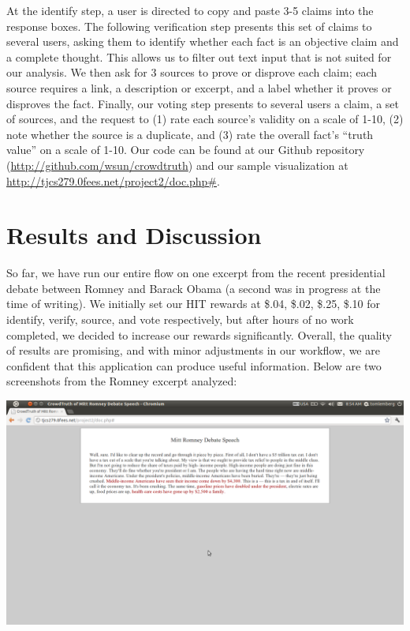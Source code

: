 \documentclass[10pt]{article}
\begin{document}
\noindent
At the identify step, a user is directed to copy and paste 3-5 claims into the response boxes. The following verification step presents this set of claims to several users, asking them to identify whether each fact is an objective claim and a complete thought. This allows us to filter out text input that is not suited for our analysis. We then ask for 3 sources to prove or disprove each claim; each source requires a link, a description or excerpt, and a label whether it proves or disproves the fact. Finally, our voting step presents to several users a claim, a set of sources, and the request to (1) rate each source's validity on a scale of 1-10, (2) note whether the source is a duplicate, and (3) rate the overall fact's ``truth value'' on a scale of 1-10. Our code can be found at our Github repository (\url{http://github.com/wsun/crowdtruth}) and our sample visualization at \url{http://tjcs279.0fees.net/project2/doc.php#}.

\section{Results and Discussion}
\noindent
So far, we have run our entire flow on one excerpt from the recent presidential debate between Romney and Barack Obama (a second was in progress at the time of writing). We initially set our HIT rewards at \$.04, \$.02, \$.25, \$.10 for identify, verify, source, and vote respectively, but after hours of no work completed, we decided to increase our rewards significantly. Overall, the quality of results are promising, and with minor adjustments in our workflow, we are confident that this application can produce useful information. Below are two screenshots from the Romney excerpt analyzed: \\

\begin{center}
\includegraphics[width=6.5in]{ui1.png}
\end{center}
\end{document}
